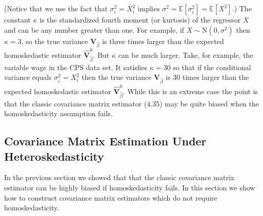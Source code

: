 \documentclass[10pt]{article}
\begin{document}
(Notice that we use the fact that $\sigma_{i}^{2}=X_{i}^{2}$ implies $\sigma^{2}=\mathbb{E}\left[\sigma_{i}^{2}\right]=\mathbb{E}\left[X^{2}\right]$.) The constant $\kappa$ is the standardized fourth moment (or kurtosis) of the regressor $X$ and can be any number greater than one. For example, if $X \sim \mathrm{N}\left(0, \sigma^{2}\right)$ then $\kappa=3$, so the true variance $\boldsymbol{V}_{\widehat{\beta}}$ is three times larger than the expected homoskedastic estimator $\widehat{\boldsymbol{V}}_{\widehat{\beta}}^{0}$. But $\kappa$ can be much larger. Take, for example, the variable wage in the CPS data set. It satisfies $\kappa=30$ so that if the conditional variance equals $\sigma_{i}^{2}=X_{i}^{2}$ then the true variance $\boldsymbol{V}_{\widehat{\beta}}$ is 30 times larger than the expected homoskedastic estimator $\widehat{\boldsymbol{V}}_{\widehat{\beta}}^{0}$. While this is an extreme case the point is that the classic covariance matrix estimator (4.35) may be quite biased when the homoskedasticity assumption fails.

\subsection{Covariance Matrix Estimation Under Heteroskedasticity}
In the previous section we showed that that the classic covariance matrix estimator can be highly biased if homoskedasticity fails. In this section we show how to construct covariance matrix estimators which do not require homoskedasticity.
\end{document}
